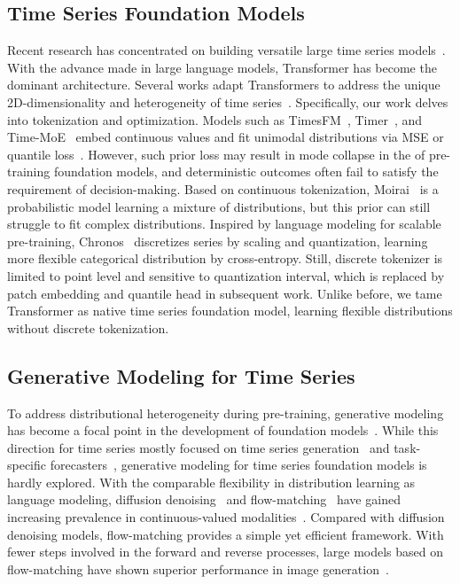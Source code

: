 \subsection{Time Series Foundation Models}
Recent research has concentrated on building versatile large time series models~\cite{liang2024foundation}. With the advance made in large language models, Transformer has become the dominant architecture. Several works adapt Transformers to address the unique 2D-dimensionality and heterogeneity of time series~\cite{woo2024unified, liu2024timer}. Specifically, our work delves into tokenization and optimization. Models such as TimesFM~\cite{das2023decoder}, Timer~\cite{liu2024timer, liutimer}, and Time-MoE~\cite{shi2024time} embed continuous values and fit unimodal distributions via MSE or quantile loss~\cite{wen2017multi}. However, such prior loss may result in mode collapse in the of pre-training foundation models, and deterministic outcomes often fail to satisfy the requirement of decision-making. Based on continuous tokenization, Moirai~\cite{woo2024unified} is a probabilistic model learning a mixture of distributions, but this prior can still struggle to fit complex distributions. Inspired by language modeling for scalable pre-training, Chronos~\cite{ansari2024chronos} discretizes series by scaling and quantization, learning more flexible categorical distribution by cross-entropy. Still, discrete tokenizer is limited to point level and sensitive to quantization interval, which is replaced by patch embedding and quantile head in subsequent work. Unlike before, we tame Transformer as native time series foundation model, learning flexible distributions without discrete tokenization.

\subsection{Generative Modeling for Time Series}
To address distributional heterogeneity during pre-training, generative modeling has become a focal point in the development of foundation models~\cite{zhao2023survey, liu2024sora}. While this direction for time series mostly focused on time series generation~\cite{tashiro2021csdi} and task-specific forecasters~\cite{rasul2021autoregressive,shen2023non,kollovieh2024flow}, generative modeling for time series foundation models is hardly explored.
With the comparable flexibility in distribution learning as language modeling, diffusion denoising~\cite{sohl2015deep} and flow-matching~\cite{lipman2022flow} have gained increasing prevalence in continuous-valued modalities~\cite{lipman2024flow}. Compared with diffusion denoising models, flow-matching provides a simple yet efficient framework. With fewer steps involved in the forward and reverse processes, large models based on flow-matching have shown superior performance in image generation~\cite{esser2024scaling}.

